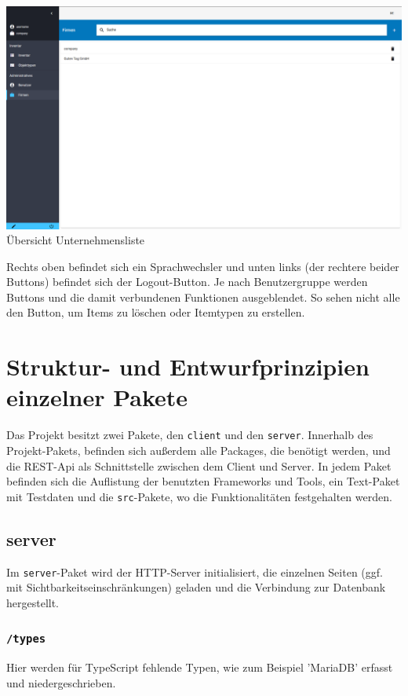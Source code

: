 \documentclass[11pt,a4paper]{report}
\begin{document}
	\begin{center}
		\includegraphics[scale=0.3]{Company.png}\\
		Übersicht Unternehmensliste\\
	\end{center}	
	
	Rechts oben befindet sich ein Sprachwechsler und unten links (der rechtere beider Buttons) befindet sich der Logout-Button. 
	Je nach Benutzergruppe werden Buttons und die damit verbundenen Funktionen ausgeblendet.
	So sehen nicht alle den Button, um Items zu löschen oder Itemtypen zu erstellen.

\newpage

	\section{Struktur- und Entwurfprinzipien einzelner Pakete}
	Das Projekt besitzt zwei Pakete, den \texttt{client} und den \texttt{server}. 
	Innerhalb des Projekt-Pakets, befinden sich außerdem alle Packages, die benötigt werden, und die REST-Api als Schnittstelle zwischen dem Client und Server. 
	In jedem Paket befinden sich die Auflistung der benutzten Frameworks und Tools, ein Text-Paket mit Testdaten und die \texttt{src}-Pakete, wo die Funktionalitäten festgehalten werden.	
	
	\subsection{server}
	Im \texttt{server}-Paket wird der HTTP-Server initialisiert, die einzelnen Seiten (ggf. mit Sichtbarkeitseinschränkungen) geladen und die Verbindung zur Datenbank hergestellt.
	
	\subsubsection*{\texttt{/types}}
	Hier werden für TypeScript fehlende Typen, wie zum Beispiel 'MariaDB' erfasst und niedergeschrieben.
	
\end{document}
